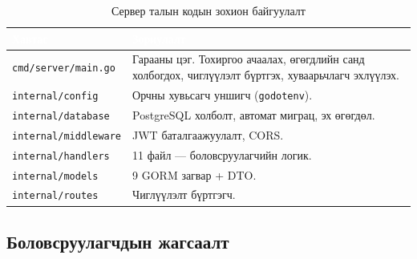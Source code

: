 \begin{table}[ht]
\centering
\footnotesize
\renewcommand{\arraystretch}{1.25}
\begin{tabular}{|p{4.2cm}|p{8cm}|}
\hline
\rowcolor{darknavy}
\textcolor{white}{\textbf{Хавтас}} & \textcolor{white}{\textbf{Зориулалт}} \\ \hline
\texttt{cmd/server/main.go}        & Гарааны цэг. Тохиргоо ачаалах, өгөгдлийн санд холбогдох, чиглүүлэлт бүртгэх, хуваарьчлагч эхлүүлэх. \\ \hline
\texttt{internal/config}           & Орчны хувьсагч уншигч (\texttt{godotenv}). \\ \hline
\texttt{internal/database}         & PostgreSQL холболт, автомат миграц, эх өгөгдөл. \\ \hline
\texttt{internal/middleware}       & JWT баталгаажуулалт, CORS. \\ \hline
\texttt{internal/handlers}         & 11 файл --- боловсруулагчийн логик. \\ \hline
\texttt{internal/models}           & 9 GORM загвар + DTO. \\ \hline
\texttt{internal/routes}           & Чиглүүлэлт бүртгэгч. \\ \hline
\end{tabular}
\caption{Сервер талын кодын зохион байгуулалт}
\label{tab:backend-layout}
\end{table}

\subsection{Боловсруулагчдын жагсаалт}

